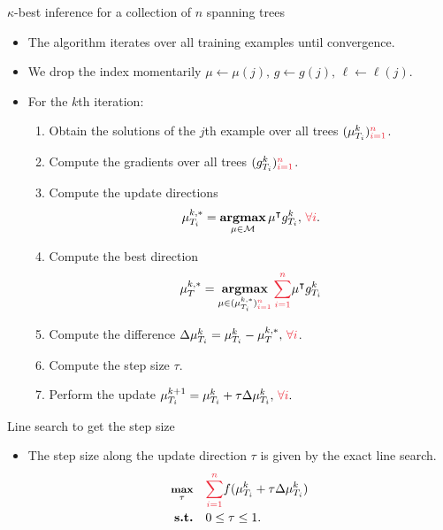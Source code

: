 \documentclass[first=dgreen,second=purple,logo=yellowexc]{aaltoslides}
\begin{document}
\begin{frame}{$\kappa$-best inference for a collection of $n$ spanning trees}
	\begin{itemize}\footnotesize
		\item The algorithm iterates over all training examples until convergence.
		\item We drop the index momentarily $\mu\leftarrow\mu(j),\,g\leftarrow g(j),\,\ell\leftarrow\ell(j)$.
		\item For the $k$th iteration:
		\begin{enumerate}\footnotesize
			\item Obtain the solutions of the $j$th example over all trees $(\vmu_{T_i}^k){\color{aaltored}_{i=1}^n}$.
			\item Compute the gradients over all trees $(g_{T_i}^k){\color{aaltored}_{i=1}^n}$.
			\item Compute the update directions
			\begin{align*}
				{\vmu}_{T_i}^{k,*} = \underset{\vmu\in\Mcal}{\argmax}\,\vmu\tp g_{T_i}^k,\,{\color{aaltored}\forall i}.
			\end{align*}
			\item Compute the best direction
			\begin{align*}
				{\vmu}_{T}^{k,*} = \underset{\vmu\in({\vmu}_{T_i}^{k,*}){\color{aaltored}_{i=1}^n}}{\argmax}\,{\color{aaltored}\sum_{i=1}^n}\vmu\tp g_{T_i}^k
			\end{align*}
			\item Compute the difference $\Delta\vmu_{T_i}^{k} = {\vmu}_{T_i}^{k} - {\vmu}_{T}^{k,*},\,{\color{aaltored}\forall i}$.
			\item Compute the step size $\tau$.
			\item Perform the update $\vmu_{T_i}^{k+1} = \vmu_{T_i}^k + \tau\Delta\vmu_{T_i}^{k},\,{\color{aaltored}\forall i}.$
		\end{enumerate}
	\end{itemize}
\end{frame}

\begin{frame}{Line search to get the step size}
	\begin{itemize}
		\item The step size along the update direction $\tau$ is given by the exact line search.
		\begin{align*}\footnotesize
			\underset{\tau}{\maximize} &\quad {\color{aaltored}\sum_{i=1}^n}f(\vmu_{T_i}^k + \tau\Delta\vmu_{T_i}^{k})\\
			\st &\quad 0\le\tau\le1.
		\end{align*}
	\end{itemize}
\end{frame}
\end{document}
